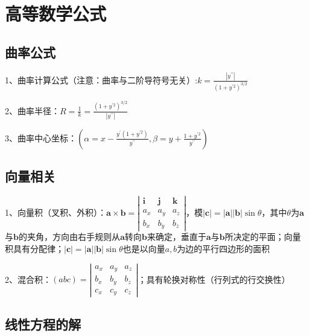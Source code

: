 \chapter{高等数学公式}

\section{曲率公式}

1、曲率计算公式（注意：曲率与二阶导符号无关）:$k=\frac{\left|y^{\prime \prime}\right|}{\left(1+y^{\prime 2}\right)^{3 / 2}}$

2、曲率半径：$R=\frac{1}{k}=\frac{\left(1+y^{\prime 2}\right)^{3 / 2}}{\left|y^{\prime \prime}\right|}$

3、曲率中心坐标：$(\alpha=x-\frac{y^{\prime}\left(1+y^{\prime 2}\right)}{y^{\prime \prime}}, \beta=y+\frac{1+y^{\prime 2}}{y^{\prime \prime}})$

\section{向量相关}

1、向量积（叉积、外积）：$\boldsymbol{a} \times \boldsymbol{b}=\left|\begin{array}{ccc}\boldsymbol{i} & \boldsymbol{j} & \boldsymbol{k} \\a_{x} & a_{y} & a_{z} \\b_{x} & b_{y} & b_{z}\end{array}\right|$，模$|\boldsymbol{c}|=|\boldsymbol{a}||\boldsymbol{b}| \sin \theta$，其中$\theta$为$\boldsymbol{a}$与$\boldsymbol{b}$的夹角，方向由右手规则从$\boldsymbol{a}$转向$\boldsymbol{b}$来确定，垂直于$\boldsymbol{a}$与$\boldsymbol{b}$所决定的平面；向量积具有分配律；$|\boldsymbol{c}|=|\boldsymbol{a}||\boldsymbol{b}| \sin \theta$也是以向量$a,b$为边的平行四边形的面积

2、混合积：$(a b c)=\left|\begin{array}{lll}a_{x} & a_{y} & a_{z} \\b_{x} & b_{y} & b_{z} \\c_{x} & c_{y} & c_{z}\end{array}\right|$；具有轮换对称性（行列式的行交换性）

\section{线性方程的解}




